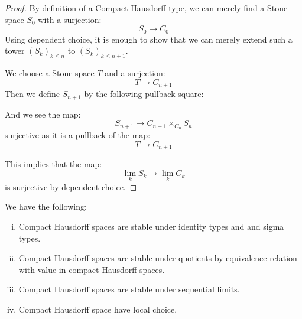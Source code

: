 \begin{proof}
By definition of a Compact Hausdorff type, we can merely find a Stone space $S_0$ with a surjection:
\[S_0\to C_0\]
Using dependent choice, it is enough to show that we can merely extend such a tower $(S_k)_{k\leq n}$ to $(S_k)_{k\leq n+1}$.

We choose a Stone space $T$ and a surjection:
\[T \to C_{n+1} \]
Then we define $S_{n+1}$ by the following pullback square:
\begin{center}
\end{center}
And we see the map:
\[S_{n+1} \to C_{n+1}\times_{C_n} S_n\] 
surjective as it is a pullback of the map:
\[T\to C_{n+1}\]

This implies that the map:
\[\lim_kS_k \to \lim_k C_k\]
is surjective by dependent choice.
\end{proof}

\begin{theorem}
We have the following:
\begin{enumerate}[(i)]
\item Compact Hausdorff spaces are stable under identity types and and sigma types.
\item Compact Hausdorff spaces are stable under quotients by equivalence relation with value in compact Hausdorff spaces.
\item Compact Hausdorff spaces are stable under sequential limits.
\item Compact Hausdorff space have local choice.
\end{enumerate}
\end{theorem}

